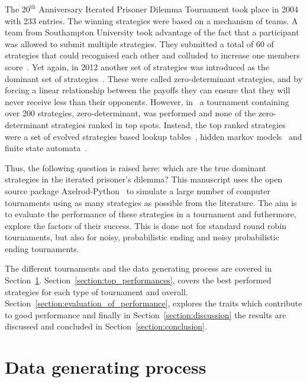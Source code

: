 \documentclass{article}
\begin{document}
The $20^{\text{th}}$ Anniversary Iterated Prisoner Dilemma Tournament took place
in 2004 with 233 entries. The winning strategies were based on a mechanism of
teams. A team from Southampton University took advantage of the fact that a
participant was allowed to submit multiple strategies. They submitted a total of
60 of strategies that could recognised each other and colluded to increase one
members score~\cite{J.P.Delahaye1993Lp, J.P.Delahaye1995LIeP, A.Rogers2007Ctpw}.
Yet again, in 2012 another set of strategies was introduced as the dominant set
of strategies~\cite{Press2012}. These were called zero-determinant strategies,
and by forcing a linear relationship between the payoffs they can ensure that
they will never receive less than their opponents. However, in~\cite{Harper2017}
a tournament containing over 200 strategies, zero-determinant, was performed and
none of the zero-determinant strategies ranked in top spots. Instead, the top
ranked strategies were a set of evolved strategies based lookup
tables~\cite{Axelrod1987}, hidden markov models~\cite{Harper2017} and finite
state automata~\cite{Miller1996}.

Thus, the following question is raised here: which are the true dominant
strategies in the iterated prisoner's dilemma?
This manuscript uses the open source package
Axelrod-Python~\cite{axelrodproject} to simulate a large number of computer
tournaments using as many strategies as possible from the literature. The aim is
to evaluate the performance of these strategies in a tournament and futhermore,
explore the factors of their success. This is done not for standard round robin
tournaments, but also for noisy, probabilistic ending and noisy probabilistic
ending tournaments.

The different tournaments and the data generating process are covered in
Section~\ref{section:data_collection}. Section~\ref{section:top_performances},
covers the best performed strategies for each type of tournament and overall.
Section~\ref{section:evaluation_of_performance}, explores the traits which
contribute to good performance and finally in Section~\ref{section:discussion}
the results are discussed and concluded in Section~\ref{section:conclusion}.

\section{Data generating process}\label{section:data_collection}
\end{document}
